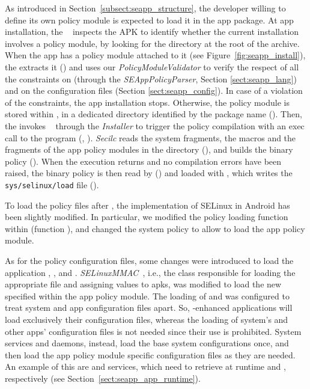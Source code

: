 As introduced in Section~\ref{subsect:seapp_structure}, the developer
willing to define its own policy module is expected to load it in the
app package.  At app installation, the \pms~\cite{seapp_pmsserva}
inspects the APK to identify whether the current installation
involves a policy module, by looking for the \apkpolicydir directory
at the root of the archive.  When the app has a policy module attached
to it (see Figure~\ref{fig:seapp_install}), the \pms extracts it
() and uses our \textit{PolicyModuleValidator} to
verify the respect of all the constraints on \sepolicy (through the
{\em SEAppPolicyParser}, Section \ref{sect:seapp_lang}) and on the
configuration files (Section \ref{sect:seapp_config}).  In case of a
violation of the constraints, the app installation stops.  Otherwise,
the policy module is stored within \dataselinux, in a dedicated
directory identified by the package name ().  Then, the
\pms invokes \installd~\cite{seapp_installdid} through the {\em
  Installer} to trigger the policy compilation with an exec call to
the \secilc program (, ).  {\em Secilc}
reads the system \sepolicy fragments, the \seapp macros and the
\sepolicy fragments of the app policy modules in the \dataselinux
directory (), and builds the binary policy
().  When the \secilc execution returns and no
compilation errors have been raised, the binary policy is then read by
\installd () and loaded with \loadpolicy, which writes
the \texttt{sys/selinux/load} file ().

To load the policy files after \init, the implementation of SELinux in
Android has been slightly modified.  In particular, we modified the
policy loading function within \libselinux (function \loadpolicy), and
changed the system policy to allow \installd to load the app policy
module.

As for the policy configuration files, some changes were introduced to
load the application \filecontexts, \seappcontexts, and
\macpermissions.  {\em SELinuxMMAC}~\cite{seapp_mmacsel}, i.e., the
class responsible for loading the appropriate \macpermissions file and assigning \seinfo values
to apks, was modified to load the new \macpermissions specified within
the app policy module.  The loading of \filecontexts and
\seappcontexts was configured to treat system and app configuration
files apart.  So, \seapp-enhanced applications will load exclusively
their configuration files, whereas the loading of system's and other
apps' configuration files is not needed since their use is prohibited.
System services and daemons, instead, load the base system
configurations once, and then load the app policy module specific
configuration files as they are needed.  An example of this are
\zygote and \restorecon services, which need to retrieve at runtime
\seappcontexts and \filecontexts, respectively (see
Section~\ref{sect:seapp_app_runtime}).

